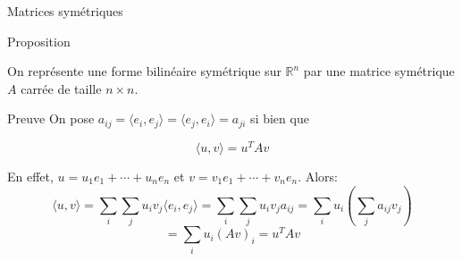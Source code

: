         \begin{parag}{Matrices symétriques}
            \begin{subparag}{Proposition}
                \begin{theoreme}
                    On représente une forme bilinéaire symétrique sur $\mathbb{R}^n$ par une matrice symétrique $A$ carrée de taille $n \times n$.
                \end{theoreme}
            \end{subparag}
            \begin{subparag}{Preuve}
                On pose $a_{ij} = \langle e_i, e_j\rangle = \langle e_j, e_i \rangle = a_{ji}$ si bien que 
                \begin{formule}
                    \[\langle u, v \rangle  = u^TAv\]
                \end{formule}
                En effet, $u = u_1e_1 + \cdots +u_ne_n$ et $v = v_1e_1 + \cdots + v_ne_n$. Alors:
                \[\langle u, v \rangle = \sum_i \sum_j u_iv_j\langle e_i, e_j\rangle = \sum_i \sum_j u_iv_ja_{ij} = \sum_i u_i\left(\sum_j a_{ij}v_j \right)\]
                \[= \sum_i u_i(Av)_i = u^TAv\]
            \end{subparag}
\end{parag}
